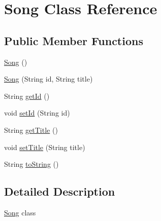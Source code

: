 \hypertarget{classcom_1_1axcoto_1_1shinjuku_1_1maki_1_1_song}{\section{\-Song \-Class \-Reference}
\label{classcom_1_1axcoto_1_1shinjuku_1_1maki_1_1_song}
}
\subsection*{\-Public \-Member \-Functions}
\begin{DoxyCompactItemize}
\item 
\hyperlink{classcom_1_1axcoto_1_1shinjuku_1_1maki_1_1_song_a9d01bd0b6e23ddfefbe224bd32a54fb7}{\-Song} ()
\item 
\hyperlink{classcom_1_1axcoto_1_1shinjuku_1_1maki_1_1_song_a5aee6050d6de1954c688007f91ec5526}{\-Song} (\-String id, \-String title)
\item 
\-String \hyperlink{classcom_1_1axcoto_1_1shinjuku_1_1maki_1_1_song_aab219518f0eaf3db55b6a62ad6b49407}{get\-Id} ()
\item 
void \hyperlink{classcom_1_1axcoto_1_1shinjuku_1_1maki_1_1_song_a0baf110c74c46a69b4c7a93bb68001b4}{set\-Id} (\-String id)
\item 
\-String \hyperlink{classcom_1_1axcoto_1_1shinjuku_1_1maki_1_1_song_a888f94790c968e3f0b5de17e509098aa}{get\-Title} ()
\item 
void \hyperlink{classcom_1_1axcoto_1_1shinjuku_1_1maki_1_1_song_a7d4a73d6a1db487dd96f658bdbc98ae9}{set\-Title} (\-String title)
\item 
\-String \hyperlink{classcom_1_1axcoto_1_1shinjuku_1_1maki_1_1_song_ad146fa8579a5f8a876c4688cc5a68520}{to\-String} ()
\end{DoxyCompactItemize}


\subsection{\-Detailed \-Description}
\hyperlink{classcom_1_1axcoto_1_1shinjuku_1_1maki_1_1_song}{\-Song} class 


